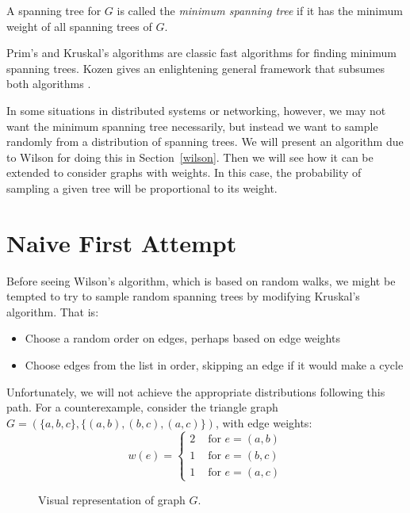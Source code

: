 \documentclass[11pt]{article}
\begin{document}
\begin{defn}
A spanning tree for $G$ is called the \emph{minimum spanning tree} if it has the
minimum weight of all spanning trees of $G$.
\end{defn}

Prim's and Kruskal's algorithms are classic fast algorithms for finding minimum
spanning trees. Kozen gives an enlightening general framework that subsumes both
algorithms \cite{kozen}.

In some situations in distributed systems or networking, however, we may not
want the minimum spanning tree necessarily, but instead we want to sample
randomly from a distribution of spanning trees. We will present an algorithm due
to Wilson \cite{wilson} for doing this in Section~\ref{wilson}. Then we will see
how it can be extended to consider graphs with weights. In this case, the
probability of sampling a given tree will be proportional to its weight.



\section{Naive First Attempt}\label{naive-attempt}

Before seeing Wilson's algorithm, which is based on random walks, we might be
tempted to try to sample random spanning trees by modifying Kruskal's algorithm.
That is:
\begin{itemize}
\item Choose a random order on edges, perhaps based on edge weights
\item Choose edges from the list in order, skipping an edge if it would make a
cycle
\end{itemize}

Unfortunately, we will not achieve the appropriate distributions following this
path. For a counterexample, consider the triangle graph $G = (\{a,b,c\},
\{(a,b),(b,c),(a,c)\})$, with edge weights:
\[w(e) = \begin{cases}
        2 & \text{ for } e = (a,b)\\
        1 & \text{ for } e = (b,c)\\
        1 & \text{ for } e = (a,c)
        \end{cases}\]

\begin{figure}
\centering
{}
\caption{Visual representation of graph $G$.} \label{fig:graph1}
\end{figure}
\end{document}
